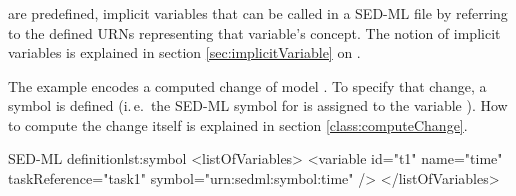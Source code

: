 \subsubsection{}
\label{sec:symbol}

 are predefined, implicit variables that can be called in a SED-ML file by referring to the defined URNs representing that variable's concept. The notion of implicit variables is explained in section \ref{sec:implicitVariable} on .

The example encodes a computed change of model . To specify that change, a symbol is defined (i.\,e.\  the SED-ML symbol for  is assigned to the variable ). How to compute the change itself is explained in section \ref{class:computeChange}.
%
\begin{myXmlLst}{SED-ML  definition}{lst:symbol}
   <listOfVariables>
    <variable id="t1" name="time" taskReference="task1" 
    symbol="urn:sedml:symbol:time" />
   </listOfVariables>
\end{myXmlLst}